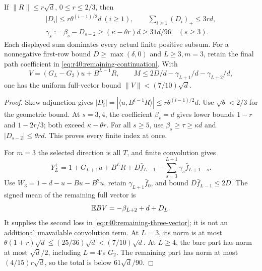 \begin{lemma}\label{lem:r40:remaining-finite-tail}
If \(\|R\|\le r\sqrt d\), \(0\le r\le2/3\), then
\begin{equation}\label{eq:r40:remaining-tail}
 \begin{gathered}
 |D_i|\le r\theta^{(i-1)/2}d\ (i\ge1),\qquad
 \sum_{i\ge1}(D_i)_+\le3rd,\\
 \gamma_s:=\beta_s-D_{s-2}\ge(\kappa-\theta r)d\ge31d/96
 \quad(s\ge3).
 \end{gathered}
\end{equation}
Each displayed sum dominates every actual finite positive subsum.
For a nonnegative first-row bound \(D\ge\max(\delta,0)\) and
\(L\ge3,m=3\), retain the final path coefficient in
\eqref{eq:r40:remaining-continuation}. With
\begin{equation}\label{eq:r40:remaining-three-vector}
 V=(G_L-G_2)u+B^{L-1}R,
 \qquad M\le2D/d-\gamma_{L+1}/d-\gamma_{L+2}/d ,
\end{equation}
one has the uniform full-vector bound
\(\|V\|<(7/10)\sqrt d\).
\end{lemma}
\begin{proof}
Skew adjunction gives
\(|D_i|=|\langle u,B^{i-1}R\rangle|
\le r\theta^{(i-1)/2}d\).
Use \(\sqrt\theta<2/3\) for the geometric bound.
At \(s=3,4\), the coefficient \(\beta_s=d\) gives lower bounds
\(1-r\) and \(1-2r/3\); both exceed \(\kappa-\theta r\).
For all \(s\ge5\), use \(\beta_s\ge\tau\ge\kappa d\) and
\(|D_{s-2}|\le\theta r d\).
This proves every finite index at once.

For \(m=3\) the selected direction is all \(T\), and finite convolution
gives
\[
 Y_L^+=1+G_{L+1}u+B^LR+D\bar f_{L-1}
           -\sum_{s=3}^{L+1}\gamma_s\bar f_{L+1-s}.
\]
Use \(W_3=1-d-u-Bu-B^2u\), retain
\(\gamma_{L+1}\bar f_0\), and bound \(D\bar f_{L-1}\le2D\).
The signed mean of the remaining full vector is
\[
 \mathbb E BV=-\beta_{L+2}+d+D_L.
\]
It supplies the second loss in
\eqref{eq:r40:remaining-three-vector}; it is not an additional
unavailable convolution term.
At \(L=3\), its norm is at most
\(\theta(1+r)\sqrt d\le(25/36)\sqrt d<(7/10)\sqrt d\).
At \(L\ge4\), the bare part has norm at most \(\sqrt d/2\),
including \(L=4\)'s \(G_2\). The remaining part has norm at most
\((4/15)r\sqrt d\), so the total is below \(61\sqrt d/90\).
\end{proof}

